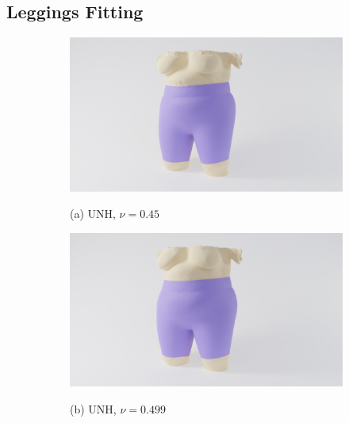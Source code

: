 \subsection{Leggings Fitting}

\begin{figure}[ht]
	\centering
	\begin{subfigure}{.32\linewidth}
		\centering
		{\includegraphics[width=6.5in]{images/body_xl/pr045.jpg}}
		\caption*{(a) UNH, $\nu = 0.45$}
		\label{sfig:teaser_pr_045}
	\end{subfigure}%
	\begin{subfigure}{.32\linewidth}
		\centering
		{\includegraphics[width=6.5in]{images/body_xl/pr0499.jpg}}
		\caption*{(b) UNH, $\nu = 0.499$}
		\label{sfig:teaser_pr_0499}
	\end{subfigure}%
	\begin{subfigure}{.32\linewidth}
		\centering

\end{subfigure}
\end{figure}
